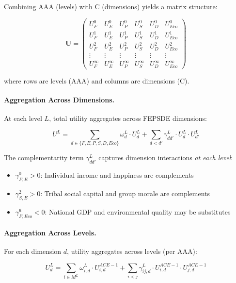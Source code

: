 Combining AAA (levels) with C (dimensions) yields a matrix structure:

\begin{equation}
\mathbf{U} = \begin{pmatrix}
U^0_F & U^0_E & U^0_P & U^0_S & U^0_D & U^0_{Eco} \\
U^1_F & U^1_E & U^1_P & U^1_S & U^1_D & U^1_{Eco} \\
U^2_F & U^2_E & U^2_P & U^2_S & U^2_D & U^2_{Eco} \\
\vdots & \vdots & \vdots & \vdots & \vdots & \vdots \\
U^{\infty}_F & U^{\infty}_E & U^{\infty}_P & U^{\infty}_S & U^{\infty}_D & U^{\infty}_{Eco}
\end{pmatrix}
\end{equation}

where rows are levels (AAA) and columns are dimensions (C).

\paragraph{Aggregation Across Dimensions.}

At each level $L$, total utility aggregates across FEPSDE dimensions:

\begin{equation}
U^L = \sum_{d \in \{F, E, P, S, D, Eco\}} \omega^L_d \cdot U^L_d + \sum_{d < d'} \gamma^L_{dd'} \cdot U^L_d \cdot U^L_{d'}
\end{equation}

The complementarity term $\gamma^L_{dd'}$ captures dimension interactions \textit{at each level}:
\begin{itemize}[nosep]
\item $\gamma^0_{F,E} > 0$: Individual income and happiness are complements
\item $\gamma^2_{S,E} > 0$: Tribal social capital and group morale are complements
\item $\gamma^6_{F,Eco} < 0$: National GDP and environmental quality may be substitutes
\end{itemize}

\paragraph{Aggregation Across Levels.}

For each dimension $d$, utility aggregates across levels (per AAA):

\begin{equation}
U^L_d = \sum_{i \in M^L} \omega^L_{i,d} \cdot U^{ACE-1}_{i,d} + \sum_{i < j} \gamma^L_{ij,d} \cdot U^{ACE-1}_{i,d} \cdot U^{ACE-1}_{j,d}
\end{equation}

